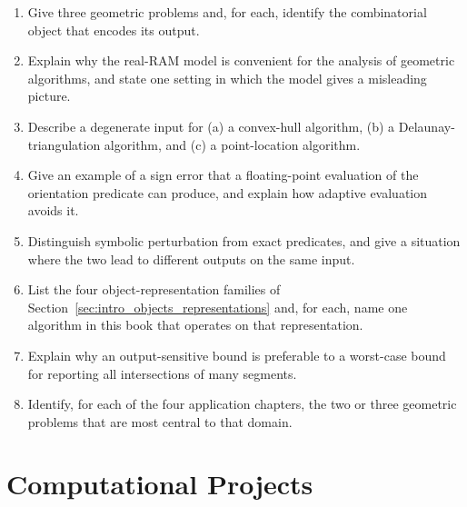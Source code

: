\begin{enumerate}
  \item Give three geometric problems and, for each, identify the
    combinatorial object that encodes its output.
  \item Explain why the real-RAM model is convenient for the analysis of
    geometric algorithms, and state one setting in which the model gives a
    misleading picture.
  \item Describe a degenerate input for (a) a convex-hull algorithm, (b) a
    Delaunay-triangulation algorithm, and (c) a point-location algorithm.
  \item Give an example of a sign error that a floating-point evaluation of
    the orientation predicate can produce, and explain how adaptive
    evaluation avoids it.
  \item Distinguish symbolic perturbation from exact predicates, and give a
    situation where the two lead to different outputs on the same input.
  \item List the four object-representation families of
    Section~\ref{sec:intro_objects_representations} and, for each, name one
    algorithm in this book that operates on that representation.
  \item Explain why an output-sensitive bound is preferable to a
    worst-case bound for reporting all intersections of many segments.
  \item Identify, for each of the four application chapters, the two or
    three geometric problems that are most central to that domain.
\end{enumerate}

\section{Computational Projects}
\label{sec:intro_projects}

